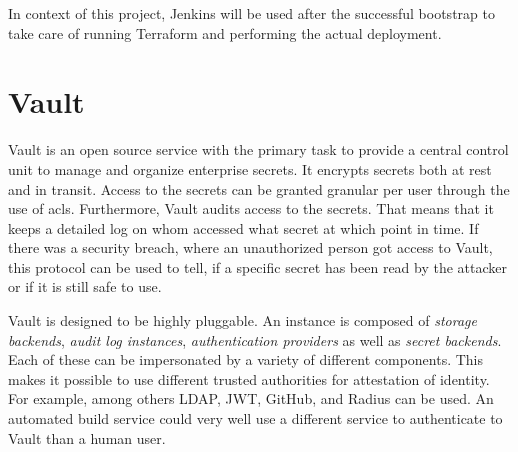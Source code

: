 In context of this project, Jenkins will be used after the successful bootstrap to take care of running Terraform and performing the actual deployment.

    

\section{Vault}
\label{sec:vault}
Vault is an open source service with the primary task to provide a central control unit to manage and organize enterprise secrets.
It encrypts secrets both at rest and in transit.
Access to the secrets can be granted granular per user through the use of \acp{acl}.
Furthermore, Vault audits access to the secrets.
That means that it keeps a detailed log on whom accessed what secret at which point in time.
If there was a security breach, where an unauthorized person got access to Vault, this protocol can be used to tell, if a specific secret has been read by the attacker or if it is still safe to use.

Vault is designed to be highly pluggable.
An instance is composed of \emph{storage backends}, \emph{audit log instances}, \emph{authentication providers} as well as \emph{secret backends}.
Each of these can be impersonated by a variety of different components.
This makes it possible to use different trusted authorities for attestation of identity.
For example, among others LDAP, JWT, GitHub, and Radius can be used.
An automated build service could very well use a different service to authenticate to Vault than a human user.

